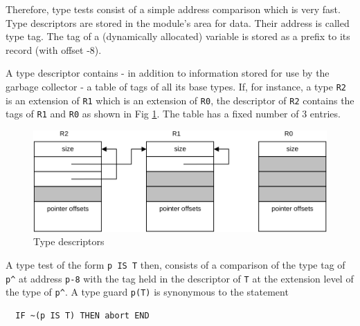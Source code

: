 Therefore, type tests consist of a simple address comparison which is very fast. Type descriptors
are stored in the module's area for data. Their address is called type tag. The tag of a (dynamically
allocated) variable is stored as a prefix to its record (with offset -8).

A type descriptor contains - in addition to information stored for use by the garbage collector - a
table of tags of all its base types. If, for instance, a type \verb|R2| is an extension of \verb|R1|
which is an extension of \verb|R0|, the descriptor of \verb|R2| contains the tags of \verb|R1| and
\verb|R0| as shown in Fig \ref{fig:typdesc}.  The table has a fixed number of 3 entries.
\begin{figure}[h!]
  \centering
  \includegraphics[width=.8\textwidth]{i/C/4.png}
  \caption{Type descriptors}
  \label{fig:typdesc}
\end{figure}

A type test of the form \verb|p IS T| then, consists of a comparison of the type tag of \verb|p^| at
address \verb|p-8| with the tag held in the descriptor of \verb|T| at the extension level of the type
of \verb|p^|. A type guard \verb|p(T)| is synonymous to the statement
\begin{verbatim}
  IF ~(p IS T) THEN abort END
\end{verbatim}

